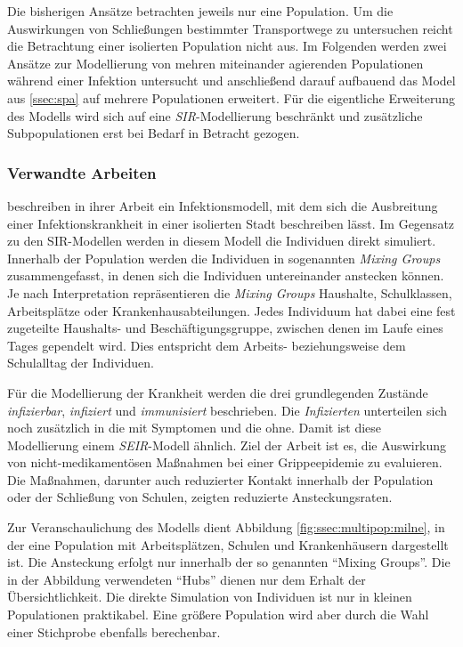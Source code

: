 Die bisherigen Ansätze betrachten jeweils nur eine Population. Um die Auswirkungen von Schließungen bestimmter Transportwege zu untersuchen reicht die Betrachtung einer isolierten Population nicht aus. Im Folgenden werden zwei Ansätze zur Modellierung von mehren miteinander agierenden Populationen während einer Infektion untersucht und anschließend darauf aufbauend das Model aus \ref{ssec:spa} auf mehrere Populationen erweitert. Für die eigentliche Erweiterung des Modells wird sich auf eine \emph{SIR}-Modellierung beschränkt und zusätzliche Subpopulationen erst bei Bedarf in Betracht gezogen.
\subsubsection{Verwandte Arbeiten}
\cite{Milne2008} beschreiben in ihrer Arbeit ein Infektionsmodell, mit dem sich die Ausbreitung einer Infektionskrankheit in einer isolierten Stadt beschreiben lässt. Im Gegensatz zu den SIR-Modellen werden in diesem Modell die Individuen direkt simuliert. Innerhalb der Population werden die Individuen in sogenannten \emph{Mixing Groups} zusammengefasst, in denen sich die Individuen untereinander anstecken können. Je nach Interpretation repräsentieren die \emph{Mixing Groups} Haushalte, Schulklassen, Arbeitsplätze oder Krankenhausabteilungen. Jedes Individuum hat dabei eine fest zugeteilte Haushalts- und Beschäftigungsgruppe, zwischen denen im Laufe eines Tages gependelt wird. Dies entspricht dem Arbeits- beziehungsweise dem Schulalltag der Individuen.

Für die Modellierung der Krankheit werden die drei grundlegenden Zustände \emph{infizierbar}, \emph{infiziert} und \emph{immunisiert} beschrieben. Die \emph{Infizierten} unterteilen sich noch zusätzlich in die mit Symptomen und die ohne. Damit ist diese Modellierung einem \emph{SEIR}-Modell ähnlich. Ziel der Arbeit ist es, die Auswirkung von nicht-medikamentösen Maßnahmen bei einer Grippeepidemie zu evaluieren. Die Maßnahmen, darunter auch reduzierter Kontakt innerhalb der Population oder der Schließung von Schulen, zeigten reduzierte Ansteckungsraten.

Zur Veranschaulichung des Modells dient Abbildung \ref{fig:ssec:multipop:milne}, in der eine Population mit Arbeitsplätzen, Schulen und Krankenhäusern dargestellt ist. Die Ansteckung erfolgt nur innerhalb der so genannten ``Mixing Groups''. Die in der Abbildung verwendeten ``Hubs'' dienen nur dem Erhalt der Übersichtlichkeit. Die direkte Simulation von Individuen ist nur in kleinen Populationen praktikabel. Eine größere Population wird aber durch die Wahl einer Stichprobe ebenfalls berechenbar.

